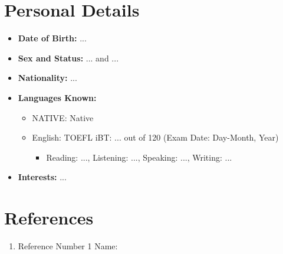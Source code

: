 \documentclass{cv}
\begin{document}

\section{Personal Details}

\begin{itemize}

\item
\textbf{Date of Birth:}
...

\item
\textbf{Sex and Status:}  
... and ...

\item
{\bf Nationality:}
...

\item
\textbf{Languages Known:}
\begin{itemize}

\item
NATIVE: Native

\item
English: 
TOEFL iBT: ... out of 120 
(Exam Date: Day-Month, Year)
\begin{itemize}

\item
Reading: ..., 
Listening: ..., 
Speaking: ...,
Writing: ... 
\end{itemize}
\end{itemize}

\item
\textbf{Interests:} 
...

\end{itemize}


\section{References}

\begin{enumerate}

\item
Reference Number 1 Name:

\end{enumerate}

\end{document}
